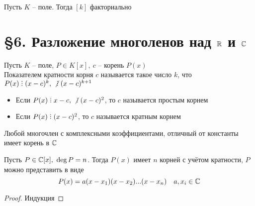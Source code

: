 \begin{implication}
	Пусть $K$ -- поле. Тогда $ [k] $ факториально
\end{implication}

\section{\S 6. Разложение многоленов над $\mathbb{R}$ и $\mathbb{C}$}

\begin{definition}
    Пусть $K$ -- поле, $P \in K[x], ~ c \text{ -- корень } P(x) $ \\
    Показателем кратности корня $c$ называется такое число $k$, что $P(x) \divby (x - c)^k, ~ \ndivby (x-c)^{k+1} $
    \begin{itemize}
    	\item Если $P(x) \divby x - c, ~ \ndivby (x-c)^2 $, то $c$ называется простым корнем
        \item Если $P(x) \divby (x-c)^2 $, то $c$ называется кратным корнем
    \end{itemize}

\end{definition}

\begin{theorem}
    Любой многочлен с комплексными коэффициентами, отличный от константы имеет корень в $ \mathbb{C} $
\end{theorem}

\begin{implication}
    Пусть $P \in \mathbb{C}[x], ~ \deg P = n $. Тогда $P(x) $ имеет $n$ корней с учётом кратности, $P$ можно представить в виде
    $$ P(x) = a(x-x_1)(x-x_2)...(x-x_n) \quad a,x_i \in \mathbb{C} $$
\end{implication}

\begin{proof}
	Индукция
\end{proof}
